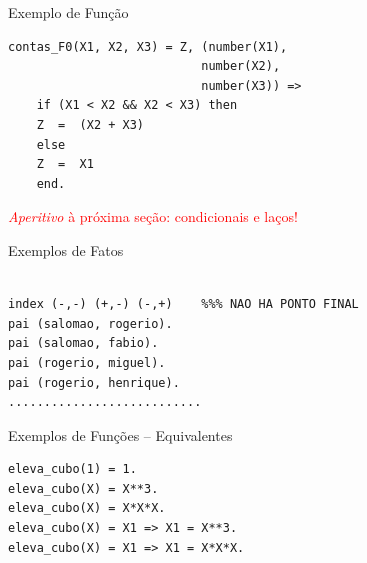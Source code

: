 \begin{frame}[fragile]

\begin{block}{Exemplo de Função}
     
\begin{lstlisting}[frame=single]
contas_F0(X1, X2, X3) = Z, (number(X1), 
                           number(X2), 
                           number(X3)) =>
    if (X1 < X2 && X2 < X3) then
    Z  =  (X2 + X3)
    else
    Z  =  X1
    end.
\end{lstlisting}
        
 \end{block}

\textcolor{red}{\textit{Aperitivo} à próxima seção: condicionais e laços!}
    
\end{frame}    

\begin{frame}[fragile]
   
\begin{block}{Exemplos de Fatos}
    
\begin{lstlisting}[frame=single]

index (-,-) (+,-) (-,+)    %%% NAO HA PONTO FINAL
pai (salomao, rogerio).
pai (salomao, fabio).
pai (rogerio, miguel).
pai (rogerio, henrique).
...........................
\end{lstlisting}

\end{block}
    
\end{frame}    
\begin{frame}[fragile]
    
\begin{block}{Exemplos de Funções -- Equivalentes}
    
\begin{lstlisting}[frame=single]
eleva_cubo(1) = 1.
eleva_cubo(X) = X**3.
eleva_cubo(X) = X*X*X.
eleva_cubo(X) = X1 => X1 = X**3.
eleva_cubo(X) = X1 => X1 = X*X*X.
\end{lstlisting}
        
\end{block}
    
\end{frame}



